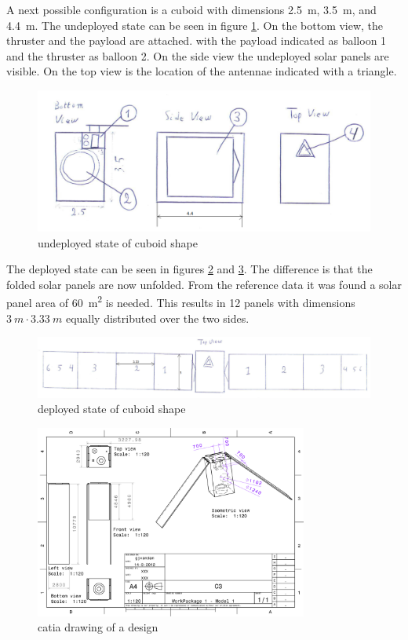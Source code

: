 A next possible configuration is a cuboid with dimensions \SI{2.5}{m},
\SI{3.5}{m}, and \SI{4.4}{m}. The undeployed state can be seen in
figure \ref{sketch2}. On the bottom view, the thruster and the payload
are attached. with the payload indicated as balloon 1 and the thruster
as balloon 2. On the side view the undeployed solar panels are
visible. On the top view is the location of the antennae indicated
with a triangle.

\begin{figure}[H]
  \centering
  \includegraphics[width=\textwidth]{boxundeployed}
  \caption{undeployed state of cuboid shape}
  \label{sketch2}
\end{figure}

The deployed state can be seen in figures \ref{sketch3} and
\ref{sketch3-1}. The difference is that the folded solar panels are
now unfolded. From the reference data it was found a solar panel area
of \SI{60}{m^2} is needed. This results in 12 panels with dimensions
$\SI{3}{m}\cdot\SI{3.33}{m}$ equally distributed over the two sides.

\begin{figure}[H]
  \centering
  \includegraphics[width=\textwidth]{boxdeployed}
  \caption{deployed state of cuboid shape}
  \label{sketch3}
\end{figure}


\begin{figure}[H]
  \centering
  \includegraphics[angle=90, width=0.8\textwidth]{catiadraw1}
  \caption{catia drawing of a design}
  \label{sketch3-1}
\end{figure}

